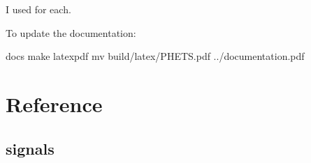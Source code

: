 \documentclass[letterpaper,10pt,openany,oneside,english]{sphinxmanual}
\begin{document}
I used  for each.

To update the documentation:

\begin{sphinxVerbatim}[commandchars=\\\{\}]
 docs
make latexpdf
mv build/latex/PHETS.pdf ../documentation.pdf
\end{sphinxVerbatim}


\chapter{Reference}
\label{\detokenize{index:reference}}

\section{signals}
\label{\detokenize{signals:signals}}\label{\detokenize{signals:module-signals}}\label{\detokenize{signals::doc}}
\end{document}
